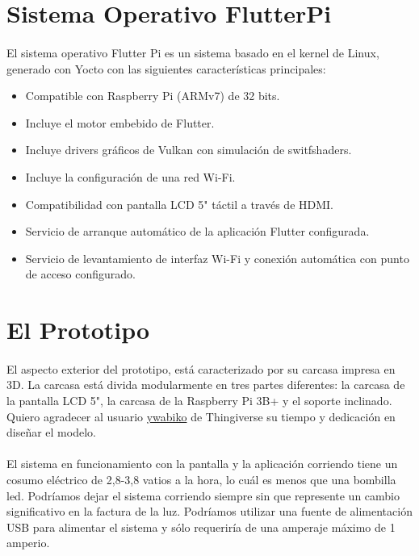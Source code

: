 \section{Sistema Operativo FlutterPi}\label{sec:flutterpi}

\paragraph{}El sistema operativo Flutter Pi es un sistema basado en el kernel de Linux,
generado con Yocto con las siguientes características principales:

\begin{itemize}
    \item Compatible con Raspberry Pi (ARMv7) de 32 bits.
    \item Incluye el motor embebido de Flutter.
    \item Incluye drivers gráficos de Vulkan con simulación de switfshaders.
    \item Incluye la configuración de una red Wi-Fi.
    \item Compatibilidad con pantalla LCD 5" táctil a través de HDMI.
    \item Servicio de arranque automático de la aplicación Flutter configurada.
    \item Servicio de levantamiento de interfaz Wi-Fi y conexión automática con
    punto de acceso configurado.
\end{itemize}

\section{El Prototipo}\label{sec:prototipo}

\paragraph{}El aspecto exterior del prototipo, está caracterizado por su carcasa impresa
en 3D. La carcasa está divida modularmente en tres partes diferentes: la carcasa de la
pantalla LCD 5", la carcasa de la Raspberry Pi 3B+ y el soporte inclinado. Quiero
agradecer al usuario \href{https://www.thingiverse.com/thing:3444545}{ywabiko} de
Thingiverse su tiempo y dedicación en diseñar el modelo.

\paragraph{}El sistema en funcionamiento con la pantalla y la aplicación corriendo
tiene un cosumo eléctrico de 2,8-3,8 vatios a la hora, lo cuál es menos que una bombilla
led. Podríamos dejar el sistema corriendo siempre sin que represente un cambio significativo
en la factura de la luz. Podríamos utilizar una fuente de alimentación USB para alimentar
el sistema y sólo requeriría de una amperaje máximo de 1 amperio.

